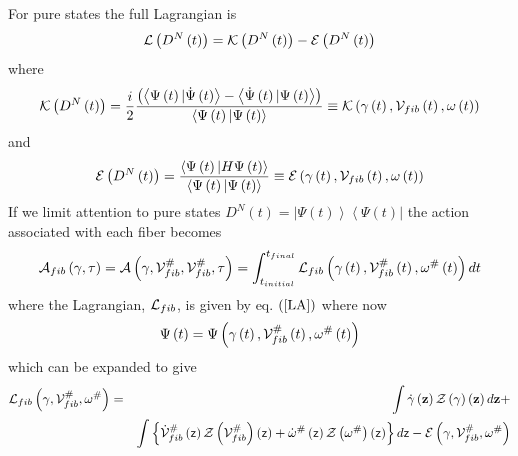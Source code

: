 For pure states the full Lagrangian is 
\begin{equation}
{\cal L}\left( D^{N}\left( t\right) \right) ={\cal K}\left( D^{N}\left(
t\right) \right) -{\cal E}\left( D^{N}\left( t\right) \right)  \label{LA}
\end{equation}%
where 
\begin{equation}
{\cal K}\left( D^{N}\left( t\right) \right) =\frac{i}{2}\frac{\left(
\left\langle \Psi \left( t\right) |\dot{\Psi}\left( t\right) \right\rangle
-\left\langle \dot{\Psi}\left( t\right) |\Psi \left( t\right) \right\rangle
\right) }{\left\langle \Psi \left( t\right) |\Psi \left( t\right)
\right\rangle }\equiv {\cal K}\left( \gamma \left( t\right) ,{\cal V}%
_{fib}\left( t\right) ,\omega \left( t\right) \right)
\end{equation}%
and 
\begin{equation}
{\cal E}\left( D^{N}\left( t\right) \right) =\frac{\left\langle \Psi \left(
t\right) |H\Psi \left( t\right) \right\rangle }{\left\langle \Psi \left(
t\right) |\Psi \left( t\right) \right\rangle }\equiv {\cal E}\left( \gamma
\left( t\right) ,{\cal V}_{fib}\left( t\right) ,\omega \left( t\right)
\right)
\end{equation}%
If we limit attention to pure states $D^{N}\left( t\right) =\left| \Psi
\left( t\right) \right\rangle \left\langle \Psi \left( t\right) \right| $
the action associated with each fiber becomes 
\begin{equation}
{\cal A}_{fib}\left( \gamma ,\tau \right) ={\cal A}\left( \gamma ,{\cal V}%
_{fib}^{\#},{\cal V}_{fib}^{\#},\tau \right) =\int_{t_{initial}}^{t_{final}}%
{\cal L}_{fib}\left( \gamma \left( t\right) ,{\cal V}_{fib}^{\#}\left(
t\right) ,\omega ^{\#}\left( t\right) \right) dt  \label{fact}
\end{equation}%
where the Lagrangian, ${\cal L}_{fib}$, is given by eq. $\left( \ref{LA}%
\right) $ where now 
\begin{equation}
\Psi \left( t\right) =\Psi \left( \gamma \left( t\right) ,{\cal V}%
_{fib}^{\#}\left( t\right) ,\omega ^{\#}\left( t\right) \right)
\end{equation}%
which can be expanded to give 
\begin{eqnarray}
{\cal L}_{fib}\left( \gamma ,{\cal V}_{fib}^{\#},\omega ^{\#}\right) &=&\int 
{\cal \dot{\gamma}}\left( {\bf z}\right) {\cal Z}\left( {\cal \gamma }%
\right) \left( {\bf z}\right) d{\bf z+}  \nonumber \\
&&\int \left\{ {\cal \dot{V}}_{fib}^{\#}\left( {\sf z}\right) {\cal Z}\left( 
{\cal V}_{fib}^{\#}\right) \left( {\sf z}\right) +{\cal \dot{\omega}}%
^{\#}\left( {\sf z}\right) {\cal Z}\left( {\cal \omega }^{\#}\right) \left( 
{\sf z}\right) \right\} d{\sf z}-{\cal E}\left( \gamma ,{\cal V}_{fib}^{\#},%
{\cal \omega }^{\#}\right)
\end{eqnarray}%
